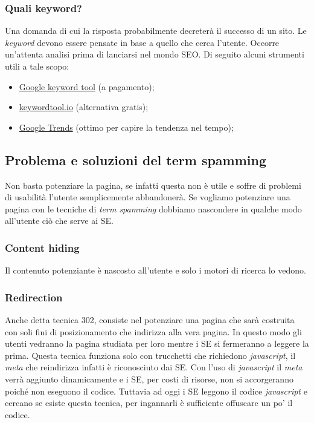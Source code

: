 			\subsubsection{Quali keyword?}
				Una domanda di cui la risposta probabilmente decreterà il successo di un sito. Le \emph{keyword} devono essere pensate in base a quello che cerca l'utente. Occorre un'attenta analisi prima di lanciarsi nel mondo SEO. Di seguito alcuni strumenti utili a tale scopo:
				\begin{itemize}
					\item \href{https://adwords.google.com/KeywordPlanner}{Google keyword tool} (a pagamento);
					\item \href{http://keywordtool.io/}{keywordtool.io} (alternativa gratis);
					\item \href{https://www.google.it/trends/}{Google Trends} (ottimo per capire la tendenza nel tempo);
				\end{itemize}
			
		\subsection{Problema e soluzioni del term spamming}
			Non basta potenziare la pagina, se infatti questa non è utile e soffre di problemi di usabilità l'utente semplicemente abbandonerà. Se vogliamo potenziare una pagina con le tecniche di \emph{term spamming} dobbiamo nascondere in qualche modo all'utente ciò che serve ai SE.
		
			\subsubsection{Content hiding}
				Il contenuto potenziante è nascosto all'utente e solo i motori di ricerca lo vedono.
			
			\subsubsection{Redirection}
				Anche detta tecnica 302, consiste nel potenziare una pagina che sarà costruita con soli fini di posizionamento che indirizza alla vera pagina. In questo modo gli utenti vedranno la pagina studiata per loro mentre i SE si fermeranno a leggere la prima. Questa tecnica funziona solo con trucchetti che richiedono \emph{javascript}, il \emph{meta} che reindirizza infatti è riconosciuto dai SE. Con l'uso di \emph{javascript} il \emph{meta} verrà aggiunto dinamicamente e i SE, per costi di risorse, non si accorgeranno poiché non eseguono il codice. Tuttavia ad oggi i SE leggono il codice \emph{javascript} e cercano se esiste questa tecnica, per ingannarli è sufficiente offuscare un po' il codice.
			
